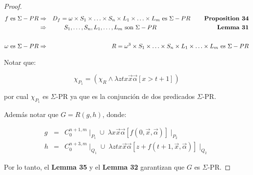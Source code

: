 \begin{proof}
    \begin{eqnarray}
      \nonumber f \text{ es } \Sigma-PR &\Rightarrow& D_{f} = \omega \times S_{1} \times \dotsc \times S_{n} \times
        L_{1} \times \dotsc \times L_{m} \text{ es } \Sigma-PR \qquad\; \text{\textbf{Proposition 34}} \\
      \nonumber &\Rightarrow& S_{1}, \dotsc, S_{n}, L_{1}, \dotsc, L_{m} \text{ son  } \Sigma-PR \qquad\qquad\qquad
        \qquad\qquad \text{\textbf{Lemma 31}} \\
      \nonumber \\
      \nonumber \omega \text{ es } \Sigma-PR &\Rightarrow& R = \omega^{3} \times S_{1} \times \dotsc \times S_{n}
        \times L_{1} \times \dotsc \times L_{m} \text{ es } \Sigma-PR
    \end{eqnarray}

    \PN Notar que:

    \[
      \chi_{P_{1}} = (\chi_{R} \wedge \lambda ztx\vec{x} \vec{\alpha}\left[x > t+1\right])
    \]

    \PN por cual $\chi_{P_{1}}$ es $\Sigma$-PR ya que es la conjunción de dos predicados $\Sigma$-PR.

    \PN Además notar que $G = R(g, h)$, donde:

    \begin{eqnarray}
      \nonumber g &=& C_{0}^{n+1,m} \mid_{P_{1}} \cup \; \lambda x\vec{x}\vec{\alpha}\left[f(0,\vec{x}, \vec{\alpha})
        \right] \mid_{P_{2}} \\
      \nonumber h &=& C_{0}^{n+3,m} \mid_{Q_{1}} \cup \; \lambda ztx\vec{x}\vec{\alpha}\left[z+f(t+1,\vec{x},
        \vec{\alpha}) \right] \mid_{Q_{2}}
    \end{eqnarray}

    \PN Por lo tanto, el \textbf{Lemma 35} y el \textbf{Lemma 32} garantizan que $G$ es $\Sigma$-PR.
  \end{proof}

